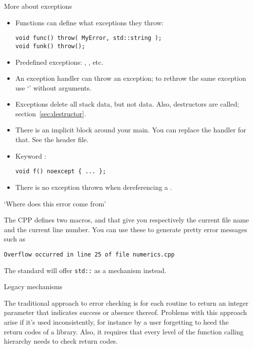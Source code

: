 \begin{block}{More about exceptions}
  \label{sl:exception-more}
  \begin{itemize}
  \item Functions can define what exceptions they throw: 
\begin{lstlisting}
void func() throw( MyError, std::string );
void funk() throw();
\end{lstlisting}
\item Predefined exceptions: ,
  , etc.
\item An exception handler can throw an exception; to rethrow the same
  exception use `' without arguments.
\item Exceptions delete all stack data, but not  data. Also,
  destructors are called; section~\ref{sec:destructor}.
\item There is an implicit  block around your
  main. You can replace the handler for that. See the
   header file.
\item Keyword :
\begin{lstlisting}
void f() noexcept { ... };
\end{lstlisting}
\item There is no exception thrown when dereferencing a .
  \end{itemize}
\end{block}

 {`Where does this error come from'}

The \ac{CPP} defines two macros,  and
 that give you respectively the current file name
and the current line number. You can use these to generate pretty
error messages such as
\begin{verbatim}
Overflow occurred in line 25 of file numerics.cpp
\end{verbatim}

The  standard will offer
\texttt{std::} as a mechanism instead.

 {Legacy mechanisms}

The traditional approach to error checking is for each routine to
return an integer parameter that indicates success or absence
thereof. 
Problems with this approach arise if it's used inconsistently, for
instance by a user forgetting to heed the return codes of a library.
Also, it requires that every level of the function calling hierarchy
needs to check return codes.

